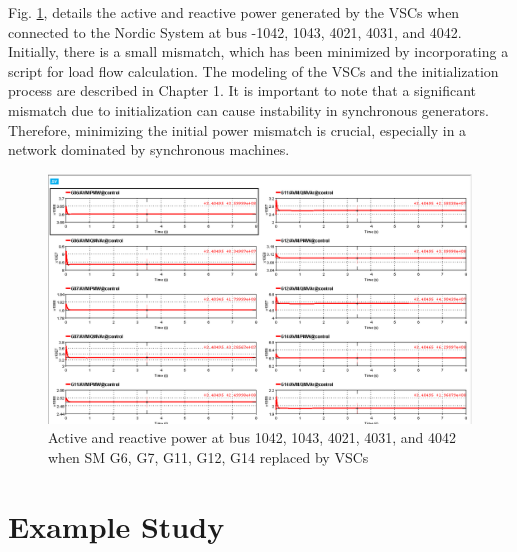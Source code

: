 \documentclass{report}
\begin{document}
Fig. \ref{fig:VSCsPQ}, details the active and reactive power generated by the VSCs when connected to the Nordic System at bus -1042, 1043, 4021, 4031, and 4042. Initially, there is a small mismatch, which has been minimized by incorporating a script for load flow calculation. The modeling of the VSCs and the initialization process are described in Chapter 1. It is important to note that a significant mismatch due to initialization can cause instability in synchronous generators. Therefore, minimizing the initial power mismatch is crucial, especially in a network dominated by synchronous machines.

\begin{figure}
    \centering
    \includegraphics[width=1\linewidth]{Figure_Nordic/NordicVSC.png}
    \caption{Active and reactive power  at bus 1042, 1043, 4021, 4031, and 4042 when SM {G6, G7, G11, G12, G14} replaced by VSCs}
    \label{fig:VSCsPQ}
\end{figure}
\section{Example Study}
\end{document}
